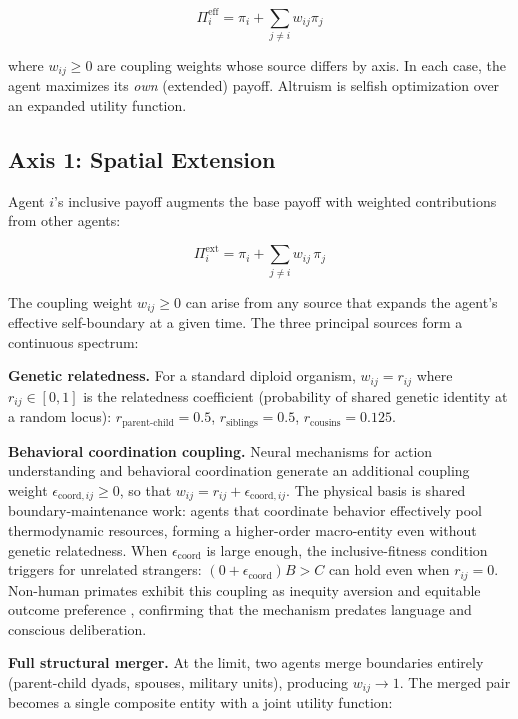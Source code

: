 \documentclass[11pt]{article}
\theoremstyle{plain}
\theoremstyle{definition}
\theoremstyle{remark}
\let\origsubsection\subsection
\renewcommand{\subsection}{\needspace{7\baselineskip}\origsubsection}
\begin{document}
\[\Pi_i^{\text{eff}} = \pi_i + \sum_{j \neq i} w_{ij} \pi_j\]

where \(w_{ij} \geq 0\) are coupling weights whose source differs by
axis. In each case, the agent maximizes its \emph{own} (extended)
payoff. Altruism is selfish optimization over an expanded utility
function.

\subsection{Axis 1: Spatial Extension}\label{axis-1-spatial-extension}

Agent \(i\)'s inclusive payoff augments the base payoff with weighted
contributions from other agents:

\[\Pi_i^{\text{ext}} = \pi_i + \sum_{j \neq i} w_{ij} \, \pi_j\]

The coupling weight \(w_{ij} \geq 0\) can arise from any source that
expands the agent's effective self-boundary at a given time. The three
principal sources form a continuous spectrum:

\textbf{Genetic relatedness.} For a standard diploid organism,
\(w_{ij} = r_{ij}\) where \(r_{ij} \in [0, 1]\) is the relatedness
coefficient (probability of shared genetic identity at a random locus):
\(r_{\text{parent-child}} = 0.5\), \(r_{\text{siblings}} = 0.5\),
\(r_{\text{cousins}} = 0.125\).

\textbf{Behavioral coordination coupling.} Neural mechanisms for action
understanding and behavioral coordination
\citep{Rizzolatti2004, deWaal2008} generate an additional coupling
weight \(\epsilon_{\text{coord},ij} \geq 0\), so that
\(w_{ij} = r_{ij} + \epsilon_{\text{coord},ij}\). The physical basis is
shared boundary-maintenance work: agents that coordinate behavior
effectively pool thermodynamic resources, forming a higher-order
macro-entity even without genetic relatedness. When
\(\epsilon_{\text{coord}}\) is large enough, the inclusive-fitness
condition triggers for unrelated strangers:
\((0 + \epsilon_{\text{coord}}) B > C\) can hold even when
\(r_{ij} = 0\). Non-human primates exhibit this coupling as inequity
aversion \citep{BrosnanDeWaal2003} and equitable outcome preference
\citep{ProctorEtAl2013}, confirming that the mechanism predates language
and conscious deliberation.

\textbf{Full structural merger.} At the limit, two agents merge
boundaries entirely (parent-child dyads, spouses, military units),
producing \(w_{ij} \to 1\). The merged pair becomes a single composite
entity with a joint utility function:
\end{document}
